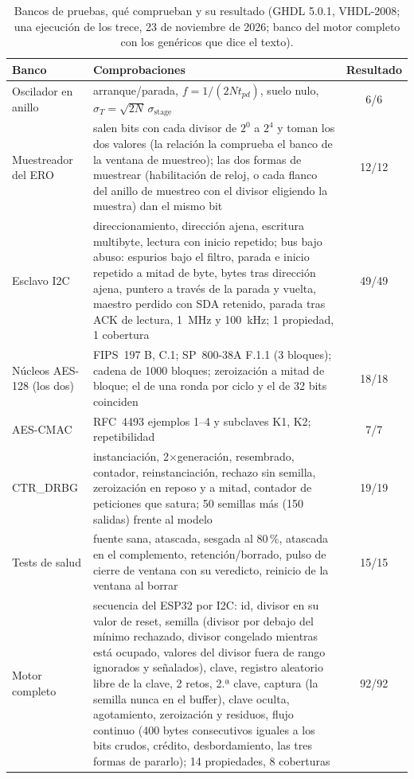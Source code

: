 \begin{table}[htbp]
\centering
\caption{Bancos de pruebas, qué comprueban y su resultado (GHDL 5.0.1,
VHDL-2008; una ejecución de los trece, 23 de noviembre de 2026; banco
del motor completo con los genéricos que dice el texto).}
\label{tab:tb}
\footnotesize
\begin{tabular}{@{}lp{8.4cm}c@{}}
\toprule
Banco & Comprobaciones & Resultado \\
\midrule
Oscilador en anillo & arranque/parada, $f = 1/(2N t_{pd})$, suelo nulo, $\sigma_T = \sqrt{2N}\,\sigma_{\mathrm{stage}}$ & 6/6 \\
Muestreador del \ac{ERO} & salen bits con cada divisor de $2^{0}$ a $2^{4}$ y toman los dos valores (la relación la comprueba el banco de la ventana de muestreo); las dos formas de muestrear (habilitación de reloj, o cada flanco del anillo de muestreo con el divisor eligiendo la muestra) dan el mismo bit & 12/12 \\
Esclavo I2C & direccionamiento, dirección ajena, escritura multibyte, lectura con inicio repetido; bus bajo abuso: espurios bajo el filtro, parada e inicio repetido a mitad de byte, bytes tras dirección ajena, puntero a través de la parada y vuelta, maestro perdido con SDA retenido, parada tras ACK de lectura, 1~MHz y 100~kHz; 1 propiedad, 1 cobertura & 49/49 \\
Núcleos AES-128 (los dos) & FIPS~197 B, C.1; SP~800-38A F.1.1 (3 bloques); cadena de 1000 bloques; zeroización a mitad de bloque; el de una ronda por ciclo y el de 32 bits coinciden & 18/18 \\
AES-CMAC & RFC~4493 ejemplos 1--4 y subclaves K1, K2; repetibilidad & 7/7 \\
CTR\_DRBG & instanciación, 2$\times$generación, resembrado, contador, reinstanciación, rechazo sin semilla, zeroización en reposo y a mitad, contador de peticiones que satura; 50 semillas más (150 salidas) frente al modelo & 19/19 \\
Tests de salud & fuente sana, atascada, sesgada al 80\,\%, atascada en el complemento, retención/borrado, pulso de cierre de ventana con su veredicto, reinicio de la ventana al borrar & 15/15 \\
Motor completo & secuencia del ESP32 por I2C: id, divisor en su valor de reset, semilla (divisor por debajo del mínimo rechazado, divisor congelado mientras está ocupado, valores del divisor fuera de rango ignorados y señalados), clave, registro aleatorio libre de la clave, 2 retos, 2.ª clave, captura (la semilla nunca en el buffer), clave oculta, agotamiento, zeroización y residuos, flujo continuo (400 bytes consecutivos iguales a los bits crudos, crédito, desbordamiento, las tres formas de pararlo); 14 propiedades, 8 coberturas & 92/92 \\

\end{tabular}
\end{table}
